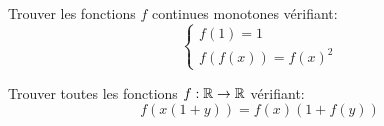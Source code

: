 \begin{exo}
Trouver les fonctions $f$ continues monotones vérifiant:
$$\begin{cases}f(1)=1\\ f(f(x))=f(x)^2\end{cases}$$
\end{exo}







\begin{exo}
Trouver toutes les fonctions $f:\mathbb R\rightarrow \mathbb R$ vérifiant:
$$f(x(1+y))=f(x)(1+f(y))$$
\end{exo}



